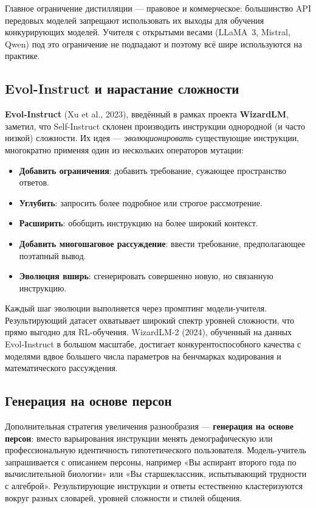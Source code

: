 Главное ограничение дистилляции --- правовое и коммерческое: большинство API передовых моделей запрещают использовать их выходы для обучения конкурирующих моделей. Учителя с открытыми весами (LLaMA~3, Mistral, Qwen) под это ограничение не подпадают и поэтому всё шире используются на практике.

\subsection{Evol-Instruct и нарастание сложности}

\textbf{Evol-Instruct} (Xu et al., 2023), введённый в рамках проекта \textbf{WizardLM}, заметил, что Self-Instruct склонен производить инструкции однородной (и часто низкой) сложности. Их идея --- \emph{эволюционировать} существующие инструкции, многократно применяя один из нескольких операторов мутации:

\begin{itemize}[leftmargin=*]
  \item \textbf{Добавить ограничения}: добавить требование, сужающее пространство ответов.
  \item \textbf{Углубить}: запросить более подробное или строгое рассмотрение.
  \item \textbf{Расширить}: обобщить инструкцию на более широкий контекст.
  \item \textbf{Добавить многошаговое рассуждение}: ввести требование, предполагающее поэтапный вывод.
  \item \textbf{Эволюция вширь}: сгенерировать совершенно новую, но связанную инструкцию.
\end{itemize}

Каждый шаг эволюции выполняется через промптинг модели-учителя. Результирующий датасет охватывает широкий спектр уровней сложности, что прямо выгодно для RL-обучения. WizardLM-2 (2024), обученный на данных Evol-Instruct в большом масштабе, достигает конкурентоспособного качества с моделями вдвое большего числа параметров на бенчмарках кодирования и математического рассуждения.

\subsection{Генерация на основе персон}

Дополнительная стратегия увеличения разнообразия --- \textbf{генерация на основе персон}: вместо варьирования инструкции менять демографическую или профессиональную идентичность гипотетического пользователя. Модель-учитель запрашивается с описанием персоны, например «Вы аспирант второго года по вычислительной биологии» или «Вы старшеклассник, испытывающий трудности с алгеброй». Результирующие инструкции и ответы естественно кластеризуются вокруг разных словарей, уровней сложности и стилей общения.

